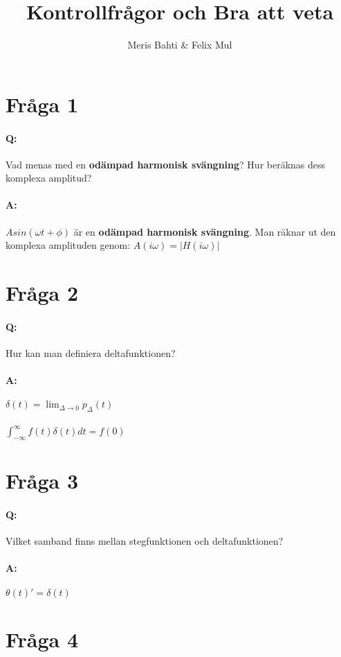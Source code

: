 \documentclass[a4paper]{article}
\title{Kontrollfrågor och Bra att veta}
\author{Meris Bahti & Felix Mul}
\begin{document}
\maketitle
\newpage
\section{Fråga 1}
\paragraph{Q:} Vad menas med en \textbf{odämpad harmonisk svängning}? Hur beräknas dess komplexa amplitud?
\paragraph{A:} $Asin(\omega t + \phi)$ är en \textbf{odämpad harmonisk svängning}. Man räknar ut den komplexa amplituden genom: $A(i\omega)=|H(i\omega)|$

\section{Fråga 2}
\paragraph{Q:} Hur kan man definiera deltafunktionen?
\paragraph{A:} $\delta(t)=\lim_{\Delta \rightarrow 0}p_\Delta(t)$
\\
\\
$\int_{-\infty}^{\infty} f(t)\delta(t)dt=f(0)$

\section{Fråga 3}
\paragraph{Q:} Vilket samband finns mellan stegfunktionen och deltafunktionen?
\paragraph{A:} $\theta(t)' = \delta(t)$

\section{Fråga 4}
\end{document}
